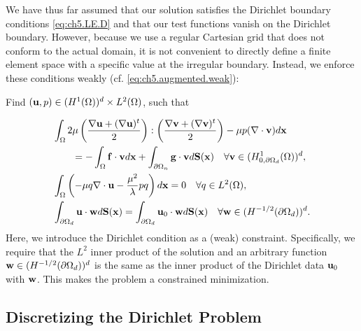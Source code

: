 We have thus far assumed that our solution satisfies the Dirichlet boundary conditions \eqref{eq:ch5.LE.D} and that our test functions vanish on the Dirichlet boundary. However, because we use a regular Cartesian grid that does not conform to the actual domain, it is not convenient to directly define a finite element space with a specific value at the irregular boundary. Instead, we enforce these conditions weakly (cf. \eqref{eq:ch5.augmented.weak}):
\begin{center}
Find $(\mathbf{u},p) \in (H^1(\Omega))^d \times L^2(\Omega)$, such that
\end{center}
\begin{subequations} \label{eq:ch5.dirichlet.weak}
\begin{align}
& \int_{\Omega} 2 \mu \left( \frac{\nabla \mathbf{u} + (\nabla \mathbf{u})^t}{2} \right) : \left( \frac{\nabla \mathbf{v} + (\nabla \mathbf{v})^t}{2} \right) - \mu p (\nabla \cdot \mathbf{v}) d\mathbf{x} \\
& \qquad = -\int_{\Omega} \mathbf{f} \cdot \mathbf{v} d\mathbf{x} + \int_{\partial\Omega_n} \mathbf{g} \cdot \mathbf{v} d\mathbf{S}(\mathbf{x}) \quad \forall \mathbf{v} \in (H^1_{0,\partial\Omega_d}(\Omega))^d, \\
& \int_{\Omega} \left( -\mu q \nabla \cdot \mathbf{u} - \frac{\mu^2}{\lambda} p q \right) d\mathbf{x} = 0 \quad \forall q \in L^2(\Omega), \\
& \int_{\partial\Omega_d} \mathbf{u} \cdot \mathbf{w} d\mathbf{S}(\mathbf{x}) = \int_{\partial\Omega_d} \mathbf{u}_0 \cdot \mathbf{w} d\mathbf{S}(\mathbf{x}) \quad \forall \mathbf{w} \in (H^{-1/2}(\partial\Omega_d))^d. \label{eq:ch5.dirichlet.constraint.continuous}
\end{align}
\end{subequations}
Here, we introduce the Dirichlet condition as a (weak) constraint. Specifically, we require that the $L^2$ inner product of the solution and an arbitrary function $\mathbf{w} \in (H^{-1/2}(\partial\Omega_d))^d$ is the same as the inner product of the Dirichlet data $\mathbf{u}_0$ with $\mathbf{w}$. This makes the problem a constrained minimization.

\subsection{Discretizing the Dirichlet Problem} \label{subsec:ch5.dirichlet.discretization}

